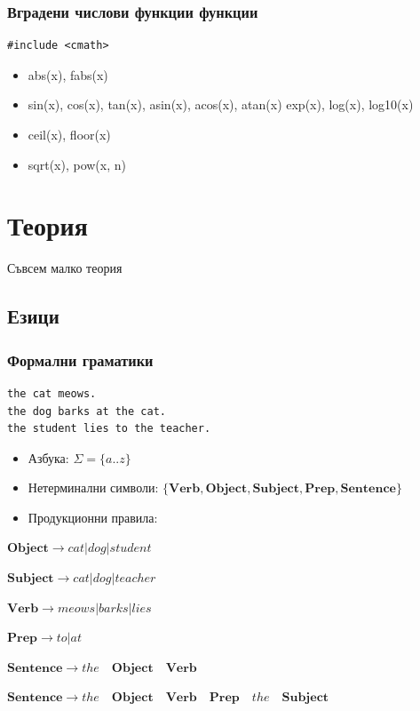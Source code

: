 \documentclass{beamer}
\begin{document}
\begin{frame}[fragile]
\frametitle{Вградени числови функции функции}


\begin{lstlisting}
#include <cmath>
\end{lstlisting}

\pause

\begin{itemize}
\item abs(x), fabs(x)
\item sin(x), cos(x), tan(x), asin(x), acos(x), atan(x) exp(x), log(x), log10(x)
\item ceil(x), floor(x)
\item sqrt(x), pow(x, n)
  
\end{itemize}


\end{frame}



\section{Теория} 

\begin{frame}
\centerline{Съвсем малко теория}
\end{frame}


\subsection{Езици} 


\begin{frame}[fragile]
\frametitle{Формални граматики}

\begin{verbatim}
the cat meows.
the dog barks at the cat.
the student lies to the teacher.
\end{verbatim}

\pause

\begin{itemize}
  \item Азбука: $\Sigma=\{a..z\}$
  \item Нетерминални символи: $\{\mathbf{Verb},\mathbf{Object},\mathbf{Subject}, \mathbf{Prep}, \mathbf{Sentence}\}$
  \item Продукционни правила: 
\end{itemize}

\pause

$\mathbf{Object} \rightarrow cat | dog | student$

$\mathbf{Subject} \rightarrow cat | dog | teacher$

$\mathbf{Verb} \rightarrow meows | barks | lies$

$\mathbf{Prep} \rightarrow to | at$

$\mathbf{Sentence} \rightarrow the  \quad \mathbf{Object} \quad  \mathbf{Verb}$

$\mathbf{Sentence} \rightarrow the \quad \mathbf{Object}  \quad\mathbf{Verb}  \quad\mathbf{Prep} \quad the \quad \mathbf{Subject}$



\end{frame}
\end{document}
